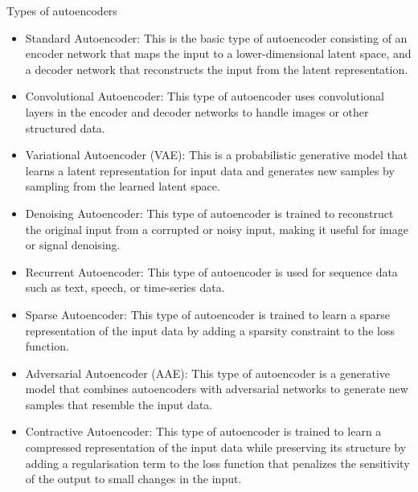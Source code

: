 \begin{frame}{Types of autoencoders}

    \begin{itemize}
        \item
        Standard Autoencoder: 
        This is the basic type of autoencoder consisting of an encoder 
        network that maps the input to a lower-dimensional latent space, 
        and a decoder network that reconstructs the input from the latent representation.
        \item
        Convolutional Autoencoder: This type of autoencoder uses convolutional 
        layers in the encoder and decoder networks to handle images or other structured data.
        \item
        Variational Autoencoder (VAE): This is a probabilistic generative 
        model that learns a latent representation for input data and generates 
        new samples by sampling from the learned latent space.
        \item
        Denoising Autoencoder: This type of autoencoder is trained to 
        reconstruct the original input from a corrupted or noisy input, 
        making it useful for image or signal denoising.
        \item
        Recurrent Autoencoder: This type of autoencoder is used for
        sequence data such as text, speech, or time-series data.
        \item
        Sparse Autoencoder: This type of autoencoder is trained to 
        learn a sparse representation of the input data by adding a 
        sparsity constraint to the loss function.
        \item
        Adversarial Autoencoder (AAE): This type of autoencoder is a 
        generative model that combines autoencoders with adversarial 
        networks to generate new samples that resemble the input data.
        \item
        Contractive Autoencoder: This type of autoencoder is trained 
        to learn a compressed representation of the input data while 
        preserving its structure by adding a regularisation term to the 
        loss function that penalizes the sensitivity of the output to small changes in the input.
    \end{itemize}

\end{frame}